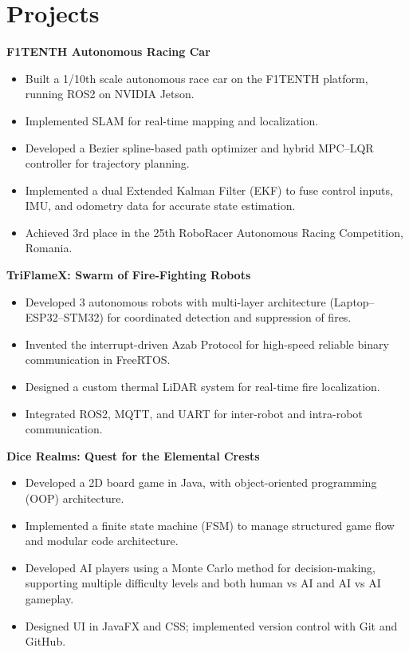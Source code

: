 \documentclass[a4paper,10pt]{article}
\begin{document}
\section*{Projects}
\textbf{F1TENTH Autonomous Racing Car}
\begin{itemize}[noitemsep,topsep=0pt]
    \item Built a 1/10th scale autonomous race car on the F1TENTH platform, running ROS2 on NVIDIA Jetson.
    \item Implemented SLAM for real-time mapping and localization.
    \item Developed a Bezier spline-based path optimizer and hybrid MPC–LQR controller for trajectory planning.
    \item Implemented a dual Extended Kalman Filter (EKF) to fuse control inputs, IMU, and odometry data for accurate state estimation.
    \item Achieved 3rd place in the 25th RoboRacer Autonomous Racing Competition, Romania.
\end{itemize}

\textbf{TriFlameX: Swarm of Fire-Fighting Robots}
\begin{itemize}[noitemsep,topsep=0pt]
    \item Developed 3 autonomous robots with multi-layer architecture (Laptop–ESP32–STM32) for coordinated detection and suppression of fires.
    \item Invented the interrupt-driven Azab Protocol for high-speed reliable binary communication in FreeRTOS.
    \item Designed a custom thermal LiDAR system for real-time fire localization.
    \item Integrated ROS2, MQTT, and UART for inter-robot and intra-robot communication.
\end{itemize}

\textbf{Dice Realms: Quest for the Elemental Crests}
\begin{itemize}[noitemsep,topsep=0pt]
    \item Developed a 2D board game in Java, with object-oriented programming (OOP) architecture.
    \item Implemented a finite state machine (FSM) to manage structured game flow and modular code architecture.
    \item Developed AI players using a Monte Carlo method for decision-making, supporting multiple difficulty levels and both human vs AI and AI vs AI gameplay.
    \item Designed UI in JavaFX and CSS; implemented version control with Git and GitHub.
\end{itemize}
\end{document}
